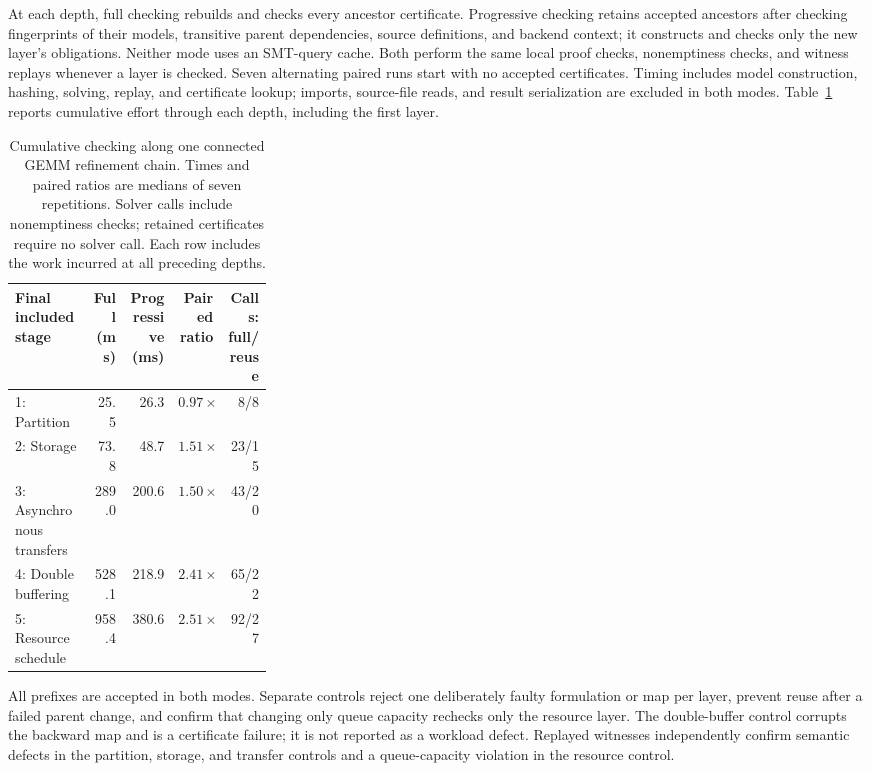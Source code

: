 \documentclass[11pt]{article}
\begin{document}
At each depth, full checking rebuilds and checks every ancestor certificate. Progressive checking retains accepted ancestors after checking fingerprints of their models, transitive parent dependencies, source definitions, and backend context; it constructs and checks only the new layer's obligations. Neither mode uses an SMT-query cache. Both perform the same local proof checks, nonemptiness checks, and witness replays whenever a layer is checked. Seven alternating paired runs start with no accepted certificates. Timing includes model construction, hashing, solving, replay, and certificate lookup; imports, source-file reads, and result serialization are excluded in both modes. Table~\ref{tab:connected-chain} reports cumulative effort through each depth, including the first layer.

\begin{table}[ht]
\centering\small
\begin{tabular}{p{0.30\linewidth}rrrr}
\toprule
Final included stage & Full (ms) & Progressive (ms) & Paired ratio & Calls: full/reuse \\
\midrule
1: Partition & 25.5 & 26.3 & $0.97\times$ & 8/8 \\
2: Storage & 73.8 & 48.7 & $1.51\times$ & 23/15 \\
3: Asynchronous transfers & 289.0 & 200.6 & $1.50\times$ & 43/20 \\
4: Double buffering & 528.1 & 218.9 & $2.41\times$ & 65/22 \\
5: Resource schedule & 958.4 & 380.6 & $2.51\times$ & 92/27 \\
\bottomrule
\end{tabular}
\caption{Cumulative checking along one connected GEMM refinement chain. Times and paired ratios are medians of seven repetitions. Solver calls include nonemptiness checks; retained certificates require no solver call. Each row includes the work incurred at all preceding depths.}\label{tab:connected-chain}
\end{table}

All prefixes are accepted in both modes. Separate controls reject one deliberately faulty formulation or map per layer, prevent reuse after a failed parent change, and confirm that changing only queue capacity rechecks only the resource layer. The double-buffer control corrupts the backward map and is a certificate failure; it is not reported as a workload defect. Replayed witnesses independently confirm semantic defects in the partition, storage, and transfer controls and a queue-capacity violation in the resource control.
\end{document}
